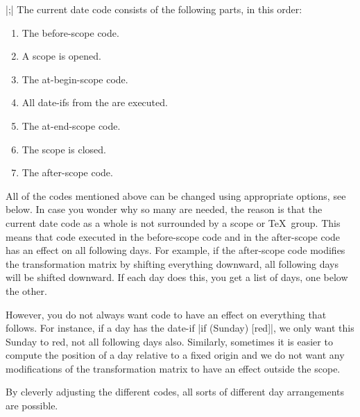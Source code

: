 \begin{command}{\calendar {}|;|}
    The current date code consists of the following parts, in this order:
    \begin{enumerate}
        \item The before-scope code.
        \item A scope is opened.
        \item The at-begin-scope code.
        \item All date-ifs from the  are executed.
        \item The at-end-scope code.
        \item The scope is closed.
        \item The after-scope code.
    \end{enumerate}
    All of the codes mentioned above can be changed using appropriate options,
    see below. In case you wonder why so many are needed, the reason is that
    the current date code as a whole is not surrounded by a scope or \TeX\
    group. This means that code executed in the before-scope code and in the
    after-scope code has an effect on all following days. For example, if the
    after-scope code modifies the transformation matrix by shifting everything
    downward, all following days will be shifted downward. If each day does
    this, you get a list of days, one below the other.

    However, you do not always want code to have an effect on everything that
    follows. For instance, if a day has the date-if |if (Sunday) [red]|, we
    only want this Sunday to red, not all following days also. Similarly,
    sometimes it is easier to compute the position of a day relative to a fixed
    origin and we do not want any modifications of the transformation matrix to
    have an effect outside the scope.

    By cleverly adjusting the different codes, all sorts of different day
    arrangements are possible.


\end{command}
